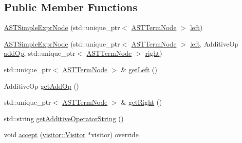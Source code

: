 \subsection*{Public Member Functions}
\begin{DoxyCompactItemize}
\item 
\hyperlink{classparser_1_1ast_1_1ASTSimpleExprNode_a882595847c545ef257df28c35ded464d}{A\+S\+T\+Simple\+Expr\+Node} (std\+::unique\+\_\+ptr$<$ \hyperlink{classparser_1_1ast_1_1ASTTermNode}{A\+S\+T\+Term\+Node} $>$ \hyperlink{classparser_1_1ast_1_1ASTSimpleExprNode_a3b8bc0ddeea8a027690259b2403c9f57}{left})
\item 
\hyperlink{classparser_1_1ast_1_1ASTSimpleExprNode_a2aa80137757c84581176e8e7e953811e}{A\+S\+T\+Simple\+Expr\+Node} (std\+::unique\+\_\+ptr$<$ \hyperlink{classparser_1_1ast_1_1ASTTermNode}{A\+S\+T\+Term\+Node} $>$ \hyperlink{classparser_1_1ast_1_1ASTSimpleExprNode_a3b8bc0ddeea8a027690259b2403c9f57}{left}, Additive\+Op \hyperlink{classparser_1_1ast_1_1ASTSimpleExprNode_a7b0f1134025df83440c78636f2c1dbd3}{add\+Op}, std\+::unique\+\_\+ptr$<$ \hyperlink{classparser_1_1ast_1_1ASTTermNode}{A\+S\+T\+Term\+Node} $>$ \hyperlink{classparser_1_1ast_1_1ASTSimpleExprNode_a3ca192d1465a7dfa33e7a1ece3084b54}{right})
\item 
std\+::unique\+\_\+ptr$<$ \hyperlink{classparser_1_1ast_1_1ASTTermNode}{A\+S\+T\+Term\+Node} $>$ \& \hyperlink{classparser_1_1ast_1_1ASTSimpleExprNode_a351105e2c9f21b40774b6e5949fdefb8}{get\+Left} ()
\item 
Additive\+Op \hyperlink{classparser_1_1ast_1_1ASTSimpleExprNode_a6081b08ef618cb72ae449d1e32913ae5}{get\+Add\+Op} ()
\item 
std\+::unique\+\_\+ptr$<$ \hyperlink{classparser_1_1ast_1_1ASTTermNode}{A\+S\+T\+Term\+Node} $>$ \& \hyperlink{classparser_1_1ast_1_1ASTSimpleExprNode_a08c175910e5c8ed18462c9919ff08343}{get\+Right} ()
\item 
std\+::string \hyperlink{classparser_1_1ast_1_1ASTSimpleExprNode_abf0a43427c061c963de936845ad3246d}{get\+Additive\+Operator\+String} ()
\item 
void \hyperlink{classparser_1_1ast_1_1ASTSimpleExprNode_a493a0e358cc89eb16f7a7ae9982d6527}{accept} (\hyperlink{classvisitor_1_1Visitor}{visitor\+::\+Visitor} $\ast$visitor) override
\end{DoxyCompactItemize}
